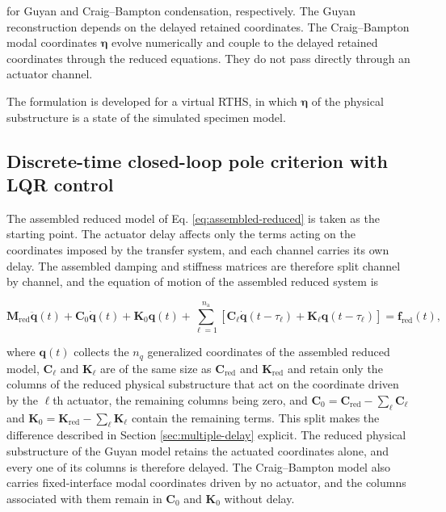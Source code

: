 \documentclass[a4paper,fleqn,review,12pt]{cas-sc}
\numberwithin{equation}{section}
\newcommand{\rev}[1]{{\color{red}#1}}
\begin{document}
\rev{for Guyan and Craig--Bampton condensation, respectively. The Guyan reconstruction depends on the delayed retained coordinates. The Craig--Bampton modal coordinates \(\bm\eta\) evolve numerically and couple to the delayed retained coordinates through the reduced equations. They do not pass directly through an actuator channel.}

The formulation is developed for a virtual RTHS, in which \(\bm{\eta}\) of the physical substructure is a state of the simulated specimen model.

\subsection{Discrete-time closed-loop pole criterion with LQR control}
\label{sec:pole-criterion}

The assembled reduced model of Eq. \eqref{eq:assembled-reduced} is taken as the starting point. The actuator delay affects only the terms acting on the coordinates imposed by the transfer system, and each channel carries its own delay. The assembled damping and stiffness matrices are therefore split channel by channel, and the equation of motion of the assembled reduced system is

\begin{equation}
	\mathbf{M}_{\mathrm{red}}\ddot{\bm{q}}(t)+\mathbf{C}_{0}\dot{\bm{q}}(t)+\mathbf{K}_{0}\bm{q}(t)
	+\sum_{\ell=1}^{n_{\mathrm{a}}}
	\left[
	\mathbf{C}_{\ell}\dot{\bm{q}}(t-\tau_{\ell})
	+\mathbf{K}_{\ell}\bm{q}(t-\tau_{\ell})
	\right]
	=\bm{f}_{\mathrm{red}}(t),
	\label{eq:delayed-eom}
\end{equation}

\noindent where \(\bm{q}(t)\) collects the \(n_{q}\) generalized coordinates of the assembled reduced model, \(\mathbf{C}_{\ell}\) and \(\mathbf{K}_{\ell}\) are of the same size as \(\mathbf{C}_{\mathrm{red}}\) and \(\mathbf{K}_{\mathrm{red}}\) and retain only the columns of the reduced physical substructure that act on the coordinate driven by the \(\ell\)th actuator, the remaining columns being zero, and \(\mathbf{C}_{0}=\mathbf{C}_{\mathrm{red}}-\sum_{\ell}\mathbf{C}_{\ell}\) and \(\mathbf{K}_{0}=\mathbf{K}_{\mathrm{red}}-\sum_{\ell}\mathbf{K}_{\ell}\) contain the remaining terms. This split makes the difference described in Section \ref{sec:multiple-delay} explicit. The reduced physical substructure of the Guyan model retains the actuated coordinates alone, and every one of its columns is therefore delayed. The Craig--Bampton model also carries fixed-interface modal coordinates driven by no actuator, and the columns associated with them remain in \(\mathbf{C}_{0}\) and \(\mathbf{K}_{0}\) without delay.
\end{document}
